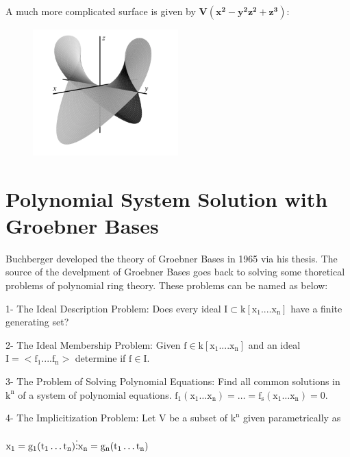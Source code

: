 \documentclass[11pt]{article}
\begin{document}
A much more complicated surface is given by $\mathbf{V(x^2 - y^2z^2 + z^3)}$:

\begin{figure}[H]
  \begin{center}
    \includegraphics[width=0.50\textwidth]{complicated.png}
    \caption{}
    \label{fig: }
  \end{center}
\end{figure}

\section{Polynomial System Solution with Groebner Bases}

Buchberger developed the theory of Groebner Bases in 1965 via his thesis. The source of the develpment of Groebner Bases goes back to solving some thoretical problems of polynomial ring theory. These problems can be named as below:

1- The Ideal Description Problem: Does every ideal $\mathrm{I \subset k[x_1....x_n]}$
have a finite generating set?

2- The Ideal Membership Problem: Given $\mathrm{f \in k[x_1....x_n]}$ and an ideal $\mathrm{I = <f_1....f_n>}$ determine if $\mathrm{f \in I}$.

3- The Problem of Solving Polynomial Equations: Find all common solutions in $\mathrm{k^n}$ of a system of polynomial equations.
$\mathrm{f_1(x_1 \ldots x_n) = \ldots = f_s(x_1 \ldots x_n) = 0}$.

4- The Implicitization Problem: Let V be a subset of $\mathrm{k^n}$ given parametrically as
\begin{center}
  $\mathrm{x_1 = g_1(t_1 \ldots t_n)} \newline
    \vdots \newline
    \mathrm{x_n = g_n(t_1 \ldots t_n)} \newline
  $
\end{center}
\end{document}
